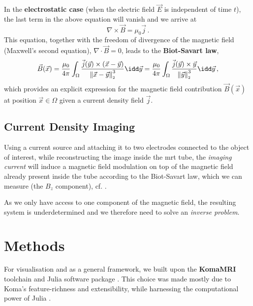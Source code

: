 \documentclass[10pt]{article}
\renewcommand{\norm}[1]{\left\lVert#1\right\rVert_{\scriptscriptstyle 2}}
\begin{document}
  In the \textbf{electrostatic case} (when the electric field $\vec{E}$ is independent of time $t$), the last term in the above equation will vanish and we arrive at
  \begin{equation}
    \nabla \times \vec{B} = \mu_0 \vec{j}\,.
    \label{eq:maxwell-4-electrostatic}
  \end{equation}
  This equation, together with the freedom of divergence of the magnetic field (Maxwell's second equation), $\nabla \cdot \vec{B} = 0$, leads to the \textbf{Biot-Savart law},
  \begin{equation}
    \vec{B}(\vec{x})
    = \frac{\mu_0}{4\pi} \int_\Omega \frac{\vec{j}(\vec{y}) \times (\vec{x} - \vec{y})}{\norm{\vec{x} - \vec{y}}^3} \idd\vec{y}
    = \frac{\mu_0}{4\pi} \int_\Omega \frac{\vec{j}(\vec{y}) \times \vec{y}}{\norm{\vec{y}}^3} \idd\vec{y}\,,
    \label{eq:biot-savart}
  \end{equation}
  which provides an explicit expression for the magnetic field contribution $\vec{B}(\vec{x})$ at position $\vec{x} \in \Omega$ given a current density field $\vec{j}$.

  \subsection{Current Density Imaging}
  Using a current source and attaching it to two electrodes connected to the object of interest, while reconstructing the image inside the \gls{mrt} tube, the \textit{imaging current} will induce a magnetic field modulation on top of the magnetic field already present inside the tube according to the Biot-Savart law, which we can measure (the $B_z$ component), cf. \cite{2004-mrcdi-from-one-var}.

  As we only have access to one component of the magnetic field, the resulting system is underdetermined and we therefore need to solve an \textit{inverse problem}.

  \section{Methods}
  For visualisation and as a general framework, we built upon the \textbf{KomaMRI} toolchain and Julia software package \parencite{2022-koma-mri}.
  This choice was made mostly due to Koma's feature-richness and extensibility, while harnessing the computational power of Julia \parencite{2017-julia}.
\end{document}
